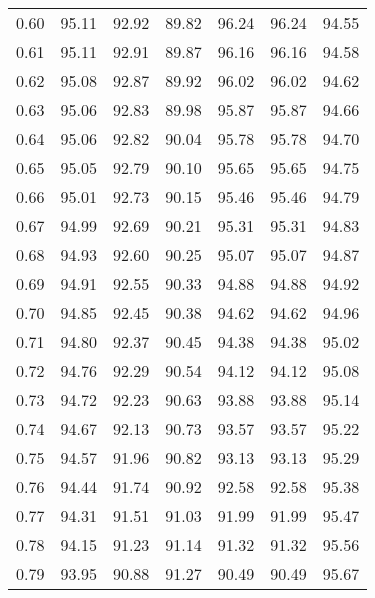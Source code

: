 \begin{tabular}{|c|c|c|c|c|c|c|}
      0.60 &     95.11 &     92.92 &      89.82 &   96.24 &      96.24 &         94.55 \\
      0.61 &     95.11 &     92.91 &      89.87 &   96.16 &      96.16 &         94.58 \\
      0.62 &     95.08 &     92.87 &      89.92 &   96.02 &      96.02 &         94.62 \\
      0.63 &     95.06 &     92.83 &      89.98 &   95.87 &      95.87 &         94.66 \\
      0.64 &     95.06 &     92.82 &      90.04 &   95.78 &      95.78 &         94.70 \\
      0.65 &     95.05 &     92.79 &      90.10 &   95.65 &      95.65 &         94.75 \\
      0.66 &     95.01 &     92.73 &      90.15 &   95.46 &      95.46 &         94.79 \\
      0.67 &     94.99 &     92.69 &      90.21 &   95.31 &      95.31 &         94.83 \\
      0.68 &     94.93 &     92.60 &      90.25 &   95.07 &      95.07 &         94.87 \\
      0.69 &     94.91 &     92.55 &      90.33 &   94.88 &      94.88 &         94.92 \\
      0.70 &     94.85 &     92.45 &      90.38 &   94.62 &      94.62 &         94.96 \\
      0.71 &     94.80 &     92.37 &      90.45 &   94.38 &      94.38 &         95.02 \\
      0.72 &     94.76 &     92.29 &      90.54 &   94.12 &      94.12 &         95.08 \\
      0.73 &     94.72 &     92.23 &      90.63 &   93.88 &      93.88 &         95.14 \\
      0.74 &     94.67 &     92.13 &      90.73 &   93.57 &      93.57 &         95.22 \\
      0.75 &     94.57 &     91.96 &      90.82 &   93.13 &      93.13 &         95.29 \\
      0.76 &     94.44 &     91.74 &      90.92 &   92.58 &      92.58 &         95.38 \\
      0.77 &     94.31 &     91.51 &      91.03 &   91.99 &      91.99 &         95.47 \\
      0.78 &     94.15 &     91.23 &      91.14 &   91.32 &      91.32 &         95.56 \\
      0.79 &     93.95 &     90.88 &      91.27 &   90.49 &      90.49 &         95.67 \\

\end{tabular}
